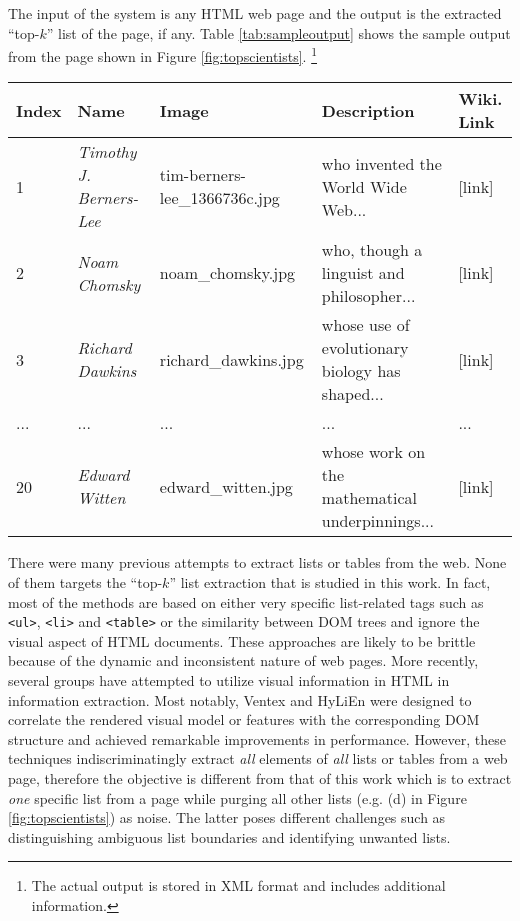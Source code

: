 The input of the system is any HTML web page 
and the output is the extracted ``top-$k$'' list of the page, if any.
Table \ref{tab:sampleoutput} shows the sample output from the page shown in
Figure \ref{fig:topscientists}.
\footnote{The actual output is stored in XML format and includes additional information.}

\begin{table*}
\centering
\begin{tabular}{|l|l|l|l|l|} \hline
{\bf Index} & {\bf Name} & {\bf Image} & {\bf Description} & {\bf Wiki. Link} \\ \hline
1 & {\em Timothy J. Berners-Lee} & tim-berners-lee\_1366736c.jpg & who invented the World Wide Web... & [link]\\ 
2 & {\em Noam Chomsky} & noam\_chomsky.jpg & who, though a linguist and philosopher... & [link]\\ 
3 & {\em Richard Dawkins} & richard\_dawkins.jpg &  whose use of evolutionary biology has shaped... & [link] \\ 
...& ... & ... & ... & ... \\
20 & {\em Edward Witten} & edward\_witten.jpg & whose work on the mathematical 
underpinnings... & [link] \\
\hline
\end{tabular}
\caption{Sample extraction output of ``20 Most Influential Scientists Alive Today'' \cite{InfluentialScientists}}
\label{tab:sampleoutput}
\end{table*}

There were many previous attempts to extract lists or tables from the web.
None of them targets the ``top-$k$'' list extraction that is studied in
this work. In fact, most of the methods are based on either very specific
list-related tags 
\cite{webtables08} 
such as {\tt <ul>}, {\tt <li>} and {\tt <table>} 
or the similarity between DOM trees 
\cite{LiuGZ03:MDR,MiaoTHSM09:TagPathClustering} and ignore
the visual aspect of HTML documents. These approaches are likely to be
brittle because of the dynamic and inconsistent nature of web
pages. More recently, several groups
have attempted to utilize visual information in HTML in 
information extraction. Most notably, Ventex 
\cite{GatterbauerBHKP2007:Towards} and HyLiEn \cite{FumarolaWBMH11:List} 
were designed to correlate the rendered visual model or features
with the corresponding DOM structure and achieved remarkable improvements
in performance. However, these techniques indiscriminatingly extract {\em all}
elements of {\em all} lists or tables from a web page, therefore the objective
is different from that of this work which is to extract {\em one} specific
list from a page while purging all other lists (e.g. (d) in
Figure \ref{fig:topscientists}) as noise. The latter poses
different challenges such as distinguishing ambiguous list boundaries
and identifying unwanted lists. 

